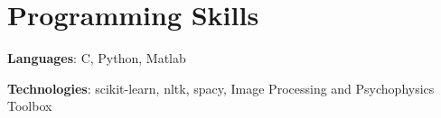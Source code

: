 \documentclass[letterpaper,11pt]{article}
\begin{document}
%
\section{Programming Skills}
 
      \textbf{Languages}{: C, Python, Matlab}
   

\textbf{Technologies}{: scikit-learn, nltk, spacy, Image Processing and Psychophysics Toolbox}
 


\end{document}
